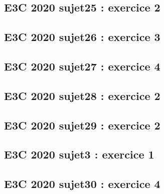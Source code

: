 \documentclass[lang=fr,edition=teacher,layout=sheet]{mxbook}
\begin{document}
\begingroup\endgroup
\par\bigskip
{}\subsection*{E3C 2020 sujet25 : exercice 2}
\begingroup\endgroup
\par\bigskip
{}\subsection*{E3C 2020 sujet26 : exercice 3}
\begingroup\endgroup
\par\bigskip
{}\subsection*{E3C 2020 sujet27 : exercice 4}
\begingroup\endgroup
\par\bigskip
{}\subsection*{E3C 2020 sujet28 : exercice 2}
\begingroup\endgroup
\par\bigskip
{}\subsection*{E3C 2020 sujet29 : exercice 2}
\begingroup\endgroup
\par\bigskip
{}\subsection*{E3C 2020 sujet3 : exercice 1}
\begingroup\endgroup
\par\bigskip
{}\subsection*{E3C 2020 sujet30 : exercice 4}
\begingroup\endgroup
\end{document}
